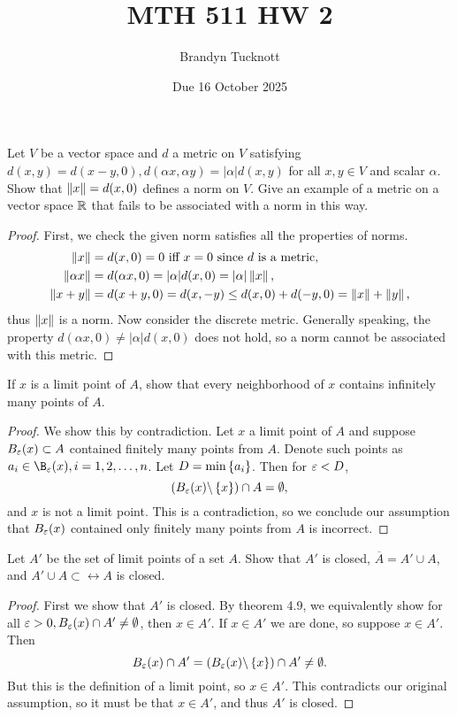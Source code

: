 \documentclass{exam}
\title{MTH 511 HW 2}
\author{Brandyn Tucknott}
\date{Due 16 October 2025}
\begin{document}
\maketitle

\begin{questions}
    \question Let $V$ be a vector space and $d$ a metric on $V$ satisfying $d(x, y) = d(x - y, 0), d(\alpha x, \alpha y) = |\alpha|d(x, y)$
    for all $x, y\in V$ and scalar $\alpha$. Show that $\left\| x \right\| = d(x, 0)$ defines a norm on $V$. Give an example of a metric on a 
    vector space $\mathbb {R}$ that fails to be associated with a norm in this way.
    \begin{proof}
        First, we check the given norm satisfies all the properties of norms.
        \begin{align*}
            \left\| x \right\| &= d(x, 0) = 0 \text{ iff } x = 0 \text{ since $d$ is a metric}, \\
            \left\| \alpha x \right\| &= d(\alpha x, 0) = |\alpha|d(x, 0) = |\alpha|\left\| x \right\|, \\
            \left\| x + y \right\| &= d(x + y, 0) = d(x, -y) \leq d(x, 0) + d(-y, 0) = \left\| x \right\| + \left\| y \right\|,
        \end{align*}
        thus $\left\| x \right\|$ is a norm. Now consider the discrete metric. Generally speaking, the property $d(\alpha x, 0) \neq |\alpha|d(x, 0)$
        does not hold, so a norm cannot be associated with this metric.
    \end{proof}


    \newpage
    \question If $x$ is a limit point of $A$, show that every neighborhood of $x$ contains infinitely many points of $A$.
    \begin{proof}
        We show this by contradiction. Let $x$ a limit point of $A$ and suppose $B_\varepsilon (x) \subset A$ contained finitely many points from $A$. Denote such points as 
        $a_i\in \B_\veps (x), i = 1, 2, \hdots, n$. Let $D = \min\left \{ a_i \right \}$. Then for $\varepsilon < D$, 
        $$\left( B_\varepsilon (x)\backslash \left \{ x \right \} \right)\cap A = \emptyset,$$
        and $x$ is not a limit point. This is a contradiction, so we conclude our assumption that $B_\varepsilon (x)$ contained only finitely many
        points from $A$ is incorrect.
    \end{proof}


    \newpage
    \question Let $A'$ be the set of limit points of a set $A$. Show that $A'$ is closed, $\overline{A} = A' \cup A$, and 
    $A' \cup A \subset \longleftrightarrow A$ is closed.
    \begin{proof}
        First we show that $A'$ is closed. By theorem 4.9, we equivalently show for all $\varepsilon > 0, B_\varepsilon (x)\cap A' \neq \emptyset$,
        then $x\in A'$. If $x\in A'$ we are done, so suppose $x\in A'$. Then
        $$B_\varepsilon (x) \cap A' = \left( B_\varepsilon (x)\backslash\left \{ x \right \} \right)\cap A' \neq \emptyset.$$
        But this is the definition of a limit point, so $x\in A'$. This contradicts our original assumption, so it must be that $x\in A'$, 
        and thus $A'$ is closed.


\end{proof}
\end{questions}
\end{document}
